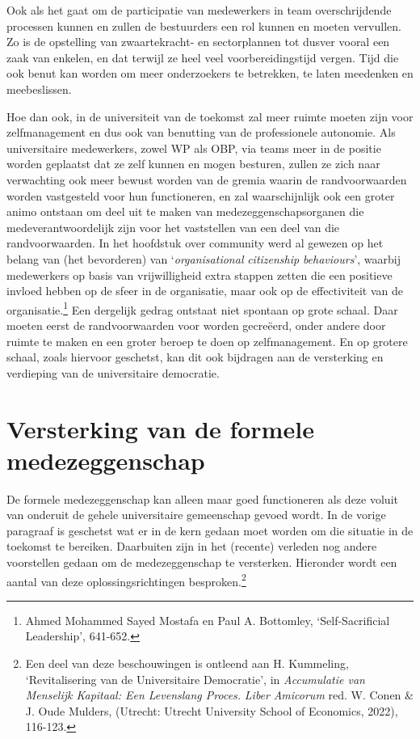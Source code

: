 \documentclass[smallauthor, chapterhaspagenum, nochapterinheader, pagenuminheader,  bigchapnum,medium2, tocpages,  garamond, titleinheader]{jote-book}
\begin{document}
	Ook als het gaat om de participatie van medewerkers in team overschrijdende processen kunnen en zullen de bestuurders een rol kunnen en moeten vervullen. Zo is de opstelling van zwaartekracht- en sectorplannen tot dusver vooral een zaak van enkelen, en dat terwijl ze heel veel voorbereidingstijd vergen. Tijd die ook benut kan worden om meer onderzoekers te betrekken, te laten meedenken en meebeslissen.



	Hoe dan ook, in de universiteit van de toekomst zal meer ruimte moeten zijn voor zelfmanagement en dus ook van benutting van de professionele autonomie. Als universitaire medewerkers, zowel WP als OBP, via teams meer in de positie worden geplaatst dat ze zelf kunnen en mogen besturen, zullen ze zich naar verwachting ook meer bewust worden van de gremia waarin de randvoorwaarden worden vastgesteld voor hun functioneren, en zal waarschijnlijk ook een groter animo ontstaan om deel uit te maken van medezeggenschapsorganen die medeverantwoordelijk zijn voor het vaststellen van een deel van die randvoorwaarden. In het hoofdstuk over community werd al gewezen op het belang van (het bevorderen) van ‘\emph{organisational}\emph{ }\emph{citizenship}\emph{ }\emph{behaviours}', waarbij medewerkers op basis van vrijwilligheid extra stappen zetten die een positieve invloed hebben op de sfeer in de organisatie, maar ook op de effectiviteit van de organisatie.\footnote{Ahmed Mohammed Sayed Mostafa en Paul A. Bottomley, ‘Self-Sacrificial Leadership', 641-652.} Een dergelijk gedrag ontstaat niet spontaan op grote schaal. Daar moeten eerst de randvoorwaarden voor worden gecreëerd, onder andere door ruimte te maken en een groter beroep te doen op zelfmanagement. En op grotere schaal, zoals hiervoor geschetst, kan dit ook bijdragen aan de versterking en verdieping van de universitaire democratie.



	\section{Versterking van de formele medezeggenschap}



	De formele medezeggenschap kan alleen maar goed functioneren als deze voluit van onderuit de gehele universitaire gemeenschap gevoed wordt. In de vorige paragraaf is geschetst wat er in de kern gedaan moet worden om die situatie in de toekomst te bereiken. Daarbuiten zijn in het (recente) verleden nog andere voorstellen gedaan om de medezeggenschap te versterken. Hieronder wordt een aantal van deze oplossingsrichtingen besproken.\footnote{Een deel van deze beschouwingen is ontleend aan H. Kummeling, ‘Revitalisering van de Universitaire Democratie', in \emph{Accumulatie van Menselijk Kapitaal: Een Levenslang Proces.}\emph{ }\emph{Liber }\emph{Amicorum}\emph{ }red. W. Conen \& J. Oude Mulders, (Utrecht: Utrecht University School of Economics, 2022), 116-123.}
\end{document}
